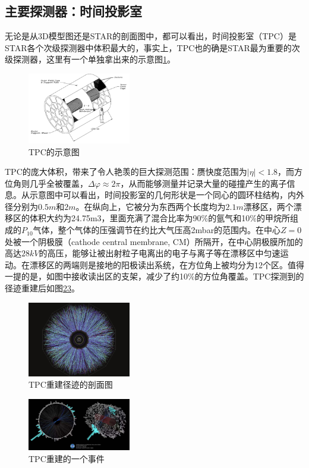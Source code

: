 \documentclass[%
 reprint,
 amsmath,amssymb,
 aps,
]{revtex4-1}
\begin{document}
\subsection{\label{sec:TPC}主要探测器：时间投影室}
无论是从3D模型图还是STAR的剖面图中，都可以看出，时间投影室（TPC）是STAR各个次级探测器中体积最大的，事实上，TPC也的确是STAR最为重要的次级探测器\cite{Ruan:2005hy}\cite{Dong:2005iq}，这里有一个单独拿出来的示意图\ref{fig:TPC}。
\begin{figure}[htbp]
    \includegraphics[width = 0.4\textwidth]{Plots/TPC.png}
    \caption{\label{fig:TPC}TPC的示意图}
\end{figure}

TPC的庞大体积，带来了令人艳羡的巨大探测范围：赝快度范围为$|\eta|<1.8$，而方位角则几乎全被覆盖，$\Delta\varphi \approx 2\pi$，从而能够测量并记录大量的碰撞产生的离子信息。从示意图中可以看出，时间投影室的几何形状是一个同心的圆环柱结构，内外径分别为$0.5\si{m}$和$2\si{m}$。在纵向上，它被分为东西两个长度均为$2.1\si{m}$漂移区，两个漂移区的体积大约为24.75m3，里面充满了混合比率为90\%的氩气和10\%的甲烷所组成的$P_{10}$气体，整个气体的压强调节在约比大气压高2mbar的范围内。在中心$Z=0$处被一个阴极膜（cathode central membrane, CM）所隔开，在中心阴极膜所加的高达$28\si{kV}$的高压，能够让被出射粒子电离出的电子与离子等在漂移区中匀速运动。在漂移区的两端则是接地的阳极读出系统，在方位角上被均分为12个区。值得一提的是，如图中接收读出区的支架，减少了约10\%的方位角覆盖。TPC探测到的径迹重建后如图\ref{fig:Eye}\ref{fig:event}。
\begin{figure}[htbp]
    \includegraphics[width=0.4\textwidth]{Plots/Eye.png}
    \caption{\label{fig:Eye}TPC重建径迹的剖面图}
\end{figure}
\begin{figure}[htbp]
    \includegraphics[width=0.4\textwidth]{Plots/event.jpg}
    \caption{\label{fig:event}TPC重建的一个事件}
\end{figure}
\end{document}
